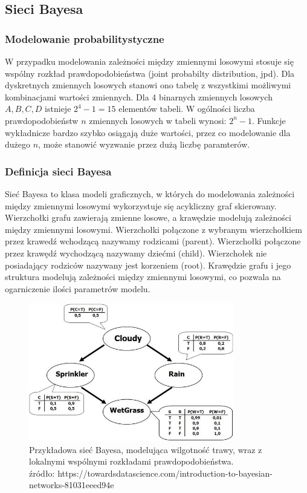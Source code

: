 \documentclass{article}
\begin{document}
\subsection{Sieci Bayesa}

\subsubsection{Modelowanie probabilitystyczne}
W przypadku modelowania zależności między zmiennymi losowymi stosuje się wspólny rozkład prawdopodobieństwa (joint probabilty distribution, jpd). Dla dyskretnych zmiennych losowych stanowi ono tabelę z wszystkimi możliwymi kombinacjami wartości zmiennych. Dla 4 binarnych zmiennych losowych $A, B, C, D$ istnieje $2^4-1 = 15$ elementów tabeli. W ogólności liczba prawdopodobieństw $n$ zmiennych losowych w tabeli wynosi: $2^n - 1$. Funkcje wykładnicze bardzo szybko osiągają duże wartości, przez co modelowanie dla dużego $n$, może stanowić wyzwanie przez dużą liczbę paramterów.

\subsubsection{Definicja sieci Bayesa}
Sieć Bayesa to klasa modeli graficznych, w których do modelowania zależności między zmiennymi losowymi wykorzystuje się acykliczny graf skierowany. Wierzchołki grafu zawierają zmienne losowe, a krawędzie modelują zależności między zmiennymi losowymi. Wierzchołki połączone z wybranym wierzchołkiem przez krawedź wchodzącą nazywamy rodzicami (parent). Wierzchołki połączone przez krawędź wychodzącą nazywamy dziećmi (child). Wierzchołek nie posiadający rodziców nazywany jest korzeniem (root). Krawędzie grafu i jego struktura modelują zależności między zmiennymi losowymi, co pozwala na ogarniczenie ilości parametrów modelu.

\begin{figure}
\centering
	\includegraphics[width=0.80\textwidth]{net.jpeg}\par\vspace{1cm}
\caption{Przykładowa sieć Bayesa, modelująca wilgotność trawy, wraz z lokalnymi wspólnymi rozkładami prawdopodobieństwa. \\ źródło: https://towardsdatascience.com/introduction-to-bayesian-networks-81031eeed94e}
	\label{fig:net}
\end{figure}
\end{document}
